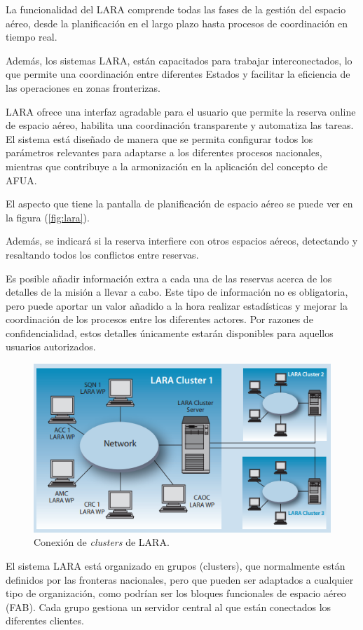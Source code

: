 La funcionalidad del LARA comprende todas las fases de la gestión del espacio aéreo, desde la planificación en el largo plazo hasta procesos de coordinación en tiempo real.

Además, los sistemas LARA, están capacitados para trabajar interconectados, lo que permite una coordinación entre diferentes Estados y facilitar la eficiencia de las operaciones en zonas fronterizas.

LARA ofrece una interfaz agradable para el usuario que permite la reserva online de espacio aéreo, habilita una coordinación transparente y automatiza las tareas. El sistema está diseñado de manera que se permita configurar todos los parámetros relevantes para adaptarse a los diferentes procesos nacionales, mientras que contribuye a la armonización en la aplicación del concepto de AFUA. 

El aspecto que tiene la pantalla de planificación de espacio aéreo se puede ver en la figura (\ref{fig:lara}).

Además, se indicará si la reserva interfiere con otros espacios aéreos, detectando y resaltando todos los conflictos entre reservas.

Es posible añadir información extra a cada una de las reservas acerca de los detalles de la misión a llevar a cabo. Este tipo de información no es obligatoria, pero puede aportar un valor añadido a la hora realizar estadísticas y mejorar la coordinación de los procesos entre los diferentes actores. Por razones de confidencialidad, estos detalles únicamente estarán disponibles para aquellos usuarios autorizados.

\begin{figure}[H]
    \centering
    \includegraphics[width=0.8\linewidth]{figuras/lara_cluster.png}
    \caption{Conexión de \textit{clusters} de LARA.}
    \label{fig:lara_cluster}
\end{figure}

El sistema LARA está organizado en grupos (clusters), que normalmente están definidos por las fronteras nacionales, pero que pueden ser adaptados a cualquier tipo de organización, como podrían ser los bloques funcionales de espacio aéreo (FAB). Cada grupo gestiona un servidor central al que están conectados los diferentes clientes.

